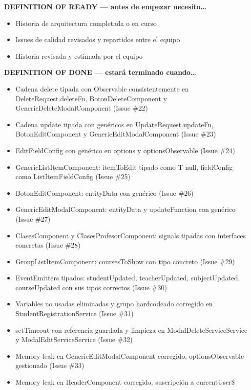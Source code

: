 \documentclass[
  spanish,
  11pt,
]{report}
\providecommand{\tightlist}{%
  \setlength{\itemsep}{0pt}\setlength{\parskip}{0pt}}
\begin{document}
\textbf{DEFINITION OF READY --- antes de empezar necesito\ldots{}}

\begin{itemize}
\tightlist
\item
  Historia de arquitectura completada o en curso
\item
  Issues de calidad revisados y repartidos entre el equipo
\item
  Historia revisada y estimada por el equipo
\end{itemize}

\textbf{DEFINITION OF DONE --- estará terminado cuando\ldots{}}

\begin{itemize}
\tightlist
\item
  Cadena delete tipada con Observable consistentemente en
  DeleteRequest.deleteFn, BotonDeleteComponent y
  GenericDeleteModalComponent (Issue \#22)
\item
  Cadena update tipada con genéricos en UpdateRequest.updateFn,
  BotonEditComponent y GenericEditModalComponent (Issue \#23)
\item
  EditFieldConfig con genérico en options y optionsObservable (Issue
  \#24)
\item
  GenericListItemComponent: itemToEdit tipado como T \textbar{} null,
  fieldConfig como ListItemFieldConfig (Issue \#25)
\item
  BotonEditComponent: entityData con genérico (Issue \#26)
\item
  GenericEditModalComponent: entityData y updateFunction con genérico
  (Issue \#27)
\item
  ClasesComponent y ClasesProfesorComponent: signals tipadas con
  interfaces concretas (Issue \#28)
\item
  GroupListItemComponent: coursesToShow con tipo concreto (Issue \#29)
\item
  EventEmitters tipados: studentUpdated, teacherUpdated, subjectUpdated,
  courseUpdated con sus tipos correctos (Issue \#30)
\item
  Variables no usadas eliminadas y grupo hardcodeado corregido en
  StudentRegistrationService (Issue \#31)
\item
  setTimeout con referencia guardada y limpieza en
  ModalDeleteServiceService y ModalEditServiceService (Issue \#32)
\item
  Memory leak en GenericEditModalComponent corregido, optionsObservable
  gestionado (Issue \#33)
\item
  Memory leak en HeaderComponent corregido, suscripción a currentUser\$

\end{itemize}
\end{document}
